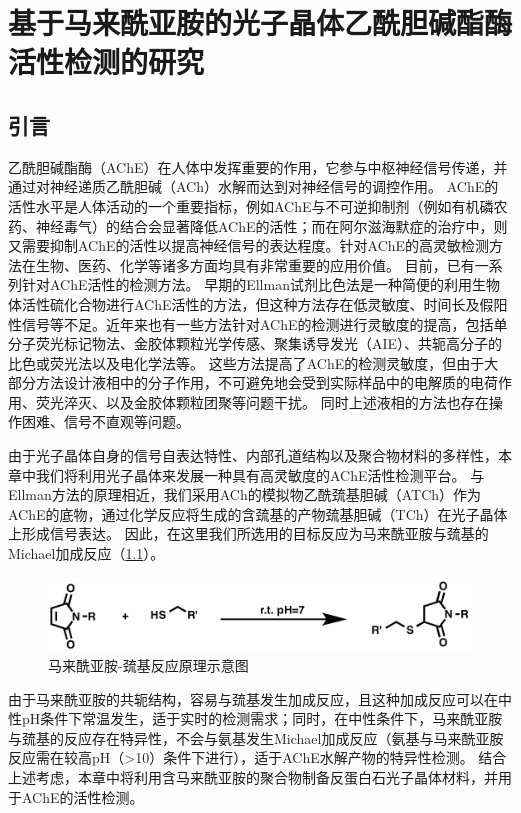 
\chapter{基于马来酰亚胺的光子晶体乙酰胆碱酯酶活性检测的研究}
\label{ch:maleimide}

\section{引言}
\label{sec:intro_maleimide}

乙酰胆碱酯酶（AChE）在人体中发挥重要的作用，它参与中枢神经信号传递，并通过对神经递质乙酰胆碱（ACh）水解而达到对神经信号的调控作用。
AChE的活性水平是人体活动的一个重要指标，例如AChE与不可逆抑制剂（例如有机磷农药、神经毒气）的结合会显著降低AChE的活性\cite{Ashani1992Mechanism,Tougu2001Acetylcholinesterase}；而在阿尔滋海默症的治疗中，则又需要抑制AChE的活性以提高神经信号的表达程度\cite{Bartolini2003Amyloid}。针对AChE的高灵敏检测方法在生物、医药、化学等诸多方面均具有非常重要的应用价值\cite{Miao2010History}。
目前，已有一系列针对AChE活性的检测方法。
早期的Ellman试剂比色法\cite{Ellman1959Tissue,Ellman1961New}是一种简便的利用生物体活性硫化合物进行AChE活性的方法，但这种方法存在低灵敏度、时间长及假阳性信号等不足\cite{Rhee2003Qualitative}。近年来也有一些方法针对AChE的检测进行灵敏度的提高，包括单分子荧光标记物法\cite{Maeda200524Dinitrobenzenesulfonyl}、金胶体颗粒光学传感\cite{Pavlov2005Inhibition,Liu2012Highlya}、聚集诱导发光（AIE）\cite{Peng2009Fluorescence}、共轭高分子的比色或荧光法\cite{Feng2007Continuous,Li2011Fluorescence}以及电化学法\cite{Yissar2003Acetylcholine,Lu2011Novel}等。
这些方法提高了AChE的检测灵敏度，但由于大部分方法设计液相中的分子作用，不可避免地会受到实际样品中的电解质的电荷作用、荧光淬灭、以及金胶体颗粒团聚等问题干扰\cite{Levy2004Rational,Guo2013Oriented}。
同时上述液相的方法也存在操作困难、信号不直观等问题。

由于光子晶体自身的信号自表达特性、内部孔道结构以及聚合物材料的多样性，本章中我们将利用光子晶体来发展一种具有高灵敏度的AChE活性检测平台。
与Ellman方法的原理相近，我们采用ACh的模拟物乙酰巯基胆碱（ATCh）作为AChE的底物，通过化学反应将生成的含巯基的产物巯基胆碱（TCh）在光子晶体上形成信号表达。
因此，在这里我们所选用的目标反应为马来酰亚胺与巯基的Michael加成反应（\ref{fig:maleimide-thio-principle}）。
\begin{figure}[b]
	\centering
	\includegraphics[width=0.6\linewidth]{figures/ch3/michael_addition.png}
	\caption{马来酰亚胺-巯基反应原理示意图}
	\label{fig:maleimide-thio-principle}
\end{figure}
由于马来酰亚胺的共轭结构，容易与巯基发生加成反应，且这种加成反应可以在中性pH条件下常温发生，适于实时的检测需求\cite{Marrian1949322}；同时，在中性条件下，马来酰亚胺与巯基的反应存在特异性，不会与氨基发生Michael加成反应（氨基与马来酰亚胺反应需在较高pH（>10）条件下进行），适于AChE水解产物的特异性检测。
结合上述考虑，本章中将利用含马来酰亚胺的聚合物制备反蛋白石光子晶体材料，并用于AChE的活性检测。

